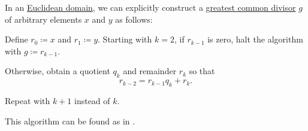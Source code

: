 \begin{algorithm}\label{alg:euclidean_algorithm}
  In an \hyperref[def:euclidean_domain]{Euclidean domain}, we can explicitly construct a \hyperref[def:gcd]{greatest common divisor} \( g \) of arbitrary elements \( x \) and \( y \) as follows:
  \begin{thmenum}
     Define \( r_0 \coloneqq x \) and \( r_1 \coloneqq y \).
     Starting with \( k = 2 \), if \( r_{k-1} \) is zero, halt the algorithm with \( g \coloneqq r_{k-1} \).

    Otherwise, obtain a quotient \( q_k \) and remainder \( r_k \) so that
    \begin{equation*}
      r_{k-2} = r_{k-1} q_k + r_k.
    \end{equation*}

    Repeat  with \( k + 1 \) instead of \( k \).
  \end{thmenum}
\end{algorithm}
\begin{comments}
  \item This algorithm can be found as  in \cite{notebook:code}.
\end{comments}

